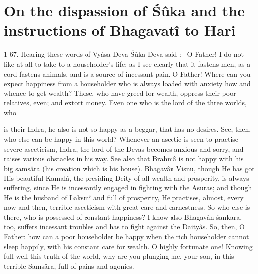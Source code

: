 \chapter{On the dispassion of \'S\^uka and the instructions of Bhagavat\^i to Hari}

1-67. Hearing these words of Vy\^asa Deva \'S\^uka Deva said :-- O Father! I do not like at all to take to a householder's life; as I see clearly that it fastens men, as a cord fastens animals, and is a source of incessant pain. O Father! Where can you expect happiness from a householder who is always loaded with anxiety how and whence to get wealth? Those, who have greed for wealth, oppress their poor relatives, even; and extort money. Even one who is the lord of the three worlds, who

is their Indra, he also is not so happy as a beggar, that has no desires. See, then, who else can be happy in this world? Whenever an ascetic is seen to practise severe asceticism, Indra, the lord of the Devas becomes anxious and sorry, and raises various obstacles in his way. See also that Brahm\^a is not happy with his big sams\^ara (his creation which is his house). Bhagav\^an Visnu, though He has got His beautiful Kamal\^a, the presiding Deity of all wealth and prosperity, is always suffering, since He is incessantly engaged in fighting with the Asuras; and though He is the husband of Laksm\^i and full of prosperity, He practises, almost, every now and then, terrible asceticism with great care and earnestness. So who else is there, who is possessed of constant happiness? I know also Bhagav\^an \'sankara, too, suffers incessant troubles and has to fight against the Daity\^as. So, then, O Father: how can a poor householder be happy when the rich householder cannot sleep happily, with his constant care for wealth. O highly fortunate one! Knowing full well this truth of the world, why are you plunging me, your son, in this terrible Sams\^ara, full of pains and agonies.

